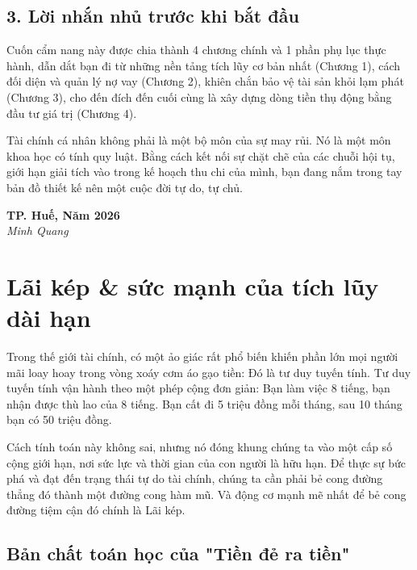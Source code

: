 \documentclass[14pt, a4paper, oneside]{extreport}
\begin{document}
\section*{3. Lời nhắn nhủ trước khi bắt đầu}

Cuốn cẩm nang này được chia thành 4 chương chính và 1 phần phụ lục thực hành, dẫn dắt bạn đi từ những nền tảng tích lũy cơ bản nhất (Chương 1), cách đối diện và quản lý nợ vay (Chương 2), khiên chắn bảo vệ tài sản khỏi lạm phát (Chương 3), cho đến đích đến cuối cùng là xây dựng dòng tiền thụ động bằng đầu tư giá trị (Chương 4).

Tài chính cá nhân không phải là một bộ môn của sự may rủi. Nó là một môn khoa học có tính quy luật. Bằng cách kết nối sự chặt chẽ của các chuỗi hội tụ, giới hạn giải tích vào trong kế hoạch thu chi của mình, bạn đang nắm trong tay bản đồ thiết kế nên một cuộc đời tự do, tự chủ. 

\vspace{0.5cm}
\begin{flushright}
\textbf{TP. Huế, Năm 2026} \\
\textit{Minh Quang}
\end{flushright}

\chapter{Lãi kép \& sức mạnh của tích lũy dài hạn}

Trong thế giới tài chính, có một ảo giác rất phổ biến khiến phần lớn mọi người mãi loay hoay trong vòng xoáy cơm áo gạo tiền: Đó là tư duy tuyến tính. Tư duy tuyến tính vận hành theo một phép cộng đơn giản: Bạn làm việc 8 tiếng, bạn nhận được thù lao của 8 tiếng. Bạn cất đi 5 triệu đồng mỗi tháng, sau 10 tháng bạn có 50 triệu đồng. 

Cách tính toán này không sai, nhưng nó đóng khung chúng ta vào một cấp số cộng giới hạn, nơi sức lực và thời gian của con người là hữu hạn. Để thực sự bức phá và đạt đến trạng thái tự do tài chính, chúng ta cần phải bẻ cong đường thẳng đó thành một đường cong hàm mũ. Và động cơ mạnh mẽ nhất để bẻ cong đường tiệm cận đó chính là Lãi kép.

\section{Bản chất toán học của "Tiền đẻ ra tiền"}
\end{document}
